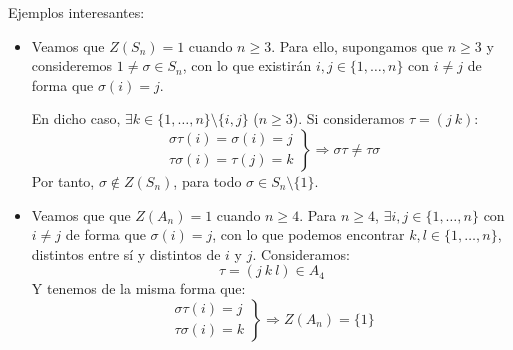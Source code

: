 \begin{ejemplo} %
    Ejemplos interesantes:
    \begin{itemize}
        \item Veamos que $Z(S_n) = 1$ cuando $n\geq 3$. Para ello, supongamos que $n\geq 3$ y consideremos $1\neq \sigma\in S_n$, con lo que existirán $i,j\in \{1,\ldots,n\}$ con $i\neq j$ de forma que $\sigma(i) = j$.

            En dicho caso, $\exists k\in \{1,\ldots,n\}\setminus \{i,j\}$ ($n\geq 3$). Si consideramos $\tau = (j\ k)$:
            \begin{equation*}
                \left.\begin{array}{r}
                    \sigma\tau(i) = \sigma(i) = j \\
                    \tau\sigma(i) = \tau(j) = k
                \end{array}\right\} \Longrightarrow \sigma\tau \neq \tau \sigma
            \end{equation*}
            Por tanto, $\sigma\notin Z(S_n)$, para todo $\sigma\in S_n\setminus\{1\}$.
        \item Veamos que  que $Z(A_n) = 1$ cuando $n\geq 4$. Para $n\geq 4$, $\exists i,j\in \{1,\ldots,n\}$ con $i\neq j$ de forma que $\sigma(i) = j$, con lo que podemos encontrar $k,l\in \{1,\ldots,n\}$, distintos entre sí y distintos de $i$ y $j$. Consideramos:
            \begin{equation*}
                \tau = (j\ k\ l) \in A_4
            \end{equation*}
            Y tenemos de la misma forma que:
            \begin{equation*}
                \left.\begin{array}{r}
                        \sigma\tau(i) = j \\
                        \tau\sigma(i) = k
                \end{array}\right\} \Longrightarrow Z(A_n) = \{1\}
            \end{equation*}
    \end{itemize}
\end{ejemplo}

